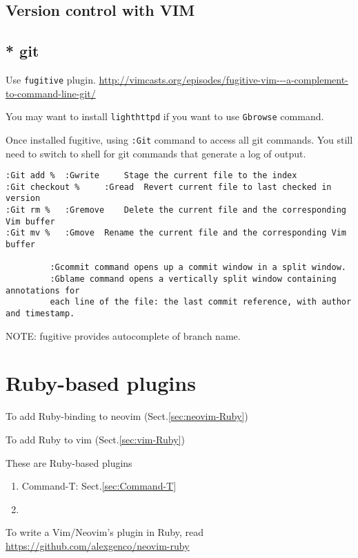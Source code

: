 \subsection{Version control with VIM}


\subsection{ * git}

Use \verb!fugitive! plugin.
\url{http://vimcasts.org/episodes/fugitive-vim---a-complement-to-command-line-git/}

You may want to install \verb!lighthttpd! if you want to use \verb!Gbrowse!
command.


Once installed fugitive, using \verb!:Git! command to access all git
commands.
You still need to switch to shell for git commands that generate a log of
output.

\begin{Verbatim}
:Git add % 	:Gwrite 	Stage the current file to the index
:Git checkout % 	:Gread 	Revert current file to last checked in version
:Git rm % 	:Gremove 	Delete the current file and the corresponding Vim buffer
:Git mv % 	:Gmove 	Rename the current file and the corresponding Vim buffer

		 :Gcommit command opens up a commit window in a split window.
		 :Gblame command opens a vertically split window containing annotations for
		 each line of the file: the last commit reference, with author and timestamp.
\end{Verbatim}

NOTE: fugitive provides autocomplete of branch name.


\section{Ruby-based plugins}
\label{sec:ruby-based-plugins-vim}


To add Ruby-binding to neovim (Sect.\ref{sec:neovim-Ruby})

To add Ruby to vim (Sect.\ref{sec:vim-Ruby})

These are Ruby-based plugins
\begin{enumerate}
  \item Command-T: Sect.\ref{sec:Command-T}
  
  \item 
\end{enumerate}

To write a Vim/Neovim's plugin in Ruby, read
\url{https://github.com/alexgenco/neovim-ruby}


